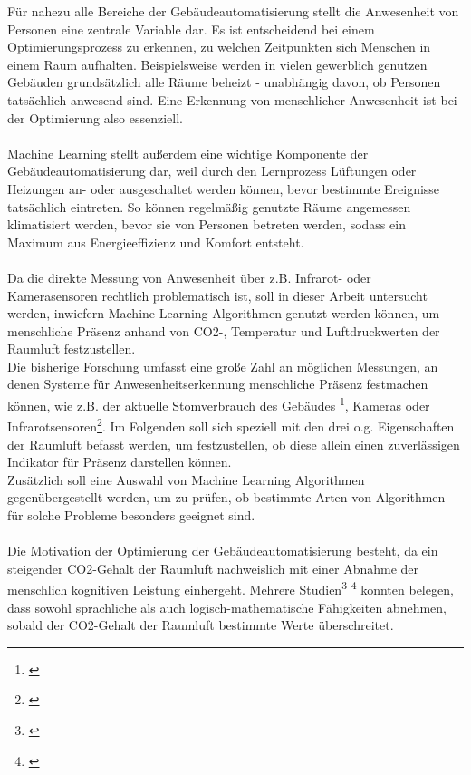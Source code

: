 Für nahezu alle Bereiche der Gebäudeautomatisierung stellt die Anwesenheit 
von Personen eine zentrale Variable dar. Es ist entscheidend bei einem Optimierungsprozess zu erkennen, zu
welchen Zeitpunkten sich Menschen in einem Raum aufhalten. Beispielsweise werden in vielen gewerblich 
genutzen Gebäuden grundsätzlich alle Räume beheizt - unabhängig davon, ob Personen tatsächlich anwesend sind. 
Eine Erkennung von menschlicher Anwesenheit ist bei der Optimierung also essenziell.\\\\
Machine Learning stellt außerdem eine wichtige Komponente der Gebäudeautomatisierung dar, weil durch den
Lernprozess Lüftungen oder Heizungen an- oder ausgeschaltet werden können, bevor bestimmte Ereignisse 
tatsächlich eintreten. So können regelmäßig genutzte Räume angemessen klimatisiert werden, bevor sie von 
Personen betreten werden, sodass ein Maximum aus Energieeffizienz und Komfort entsteht.\\\\
Da die direkte Messung von Anwesenheit über z.B. Infrarot- oder Kamerasensoren rechtlich problematisch ist, 
soll in dieser Arbeit untersucht werden, inwiefern Machine-Learning Algorithmen genutzt werden können, 
um menschliche Präsenz anhand von CO2-, Temperatur und Luftdruckwerten der Raumluft festzustellen.\\
Die bisherige Forschung umfasst eine große Zahl an möglichen Messungen, an denen Systeme für 
Anwesenheitserkennung menschliche Präsenz festmachen können, wie z.B. der aktuelle Stomverbrauch 
des Gebäudes \footnote[1]{\cite{Kleiminger}}, Kameras oder Infrarotsensoren\footnote[2]{\cite{Krieger}}. 
Im Folgenden soll sich speziell mit den drei o.g. Eigenschaften der 
Raumluft befasst werden, um festzustellen, ob diese allein einen zuverlässigen Indikator für Präsenz 
darstellen können.\\
Zusätzlich soll eine Auswahl von Machine Learning Algorithmen gegenübergestellt werden, um zu prüfen, ob
bestimmte Arten von Algorithmen für solche Probleme besonders geeignet sind.\\\\
Die Motivation der Optimierung der Gebäudeautomatisierung besteht, da ein steigender CO2-Gehalt der 
Raumluft nachweislich mit einer Abnahme der menschlich kognitiven Leistung einhergeht. 
Mehrere Studien\footnote[3]{\cite{SNOW}} \footnote[4]{\cite{RIHAMJABER}} konnten belegen, dass 
sowohl sprachliche als auch logisch-mathematische Fähigkeiten abnehmen, sobald 
der CO2-Gehalt der Raumluft bestimmte Werte überschreitet.\\ 
